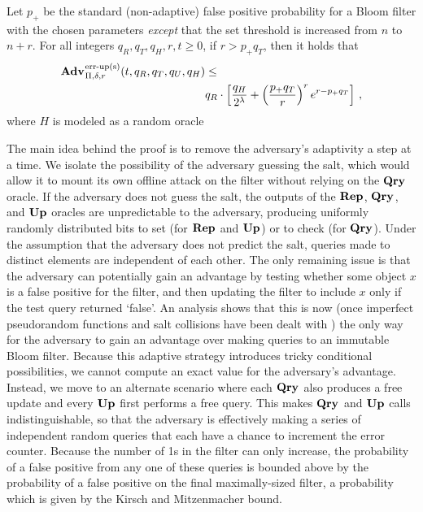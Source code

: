 \begin{theorem}\label{thm:sbf-erreps}
Let $p_+$ be the standard (non-adaptive) false positive probability for a Bloom
filter with the chosen parameters \emph{except} that the set threshold is
increased from $n$ to $n+r$. For all integers $q_R, q_T, q_H, r, t \geq 0$, if
$r > p_+q_T$, then it holds that
  \begin{eqnarray*}
    \begin{aligned}
      \Adv{\erreps}_{\Pi,\delta,r}(t,q_R, q_T, q_U, q_H) &\leq \\
          & q_R \cdot \left[
      \frac{q_H}{2^\lambda} +
      \left(\frac{p_+q_T}{r}\right)^re^{r-p_+q_T}\right]\,,
    \end{aligned}
\end{eqnarray*}
where $H$ is modeled as a random oracle
\end{theorem}

%
The main idea behind the proof is to remove the adversary's
adaptivity a step at a time. We isolate the possibility of the adversary
guessing the salt, which would allow it to mount its own offline attack on the
filter without relying on the $\textup{\textbf{Qry}}\hspace{0.5pt}$ oracle. If the adversary does not guess
the salt, the outputs of the $\textup{\textbf{Rep}}\hspace{0.5pt}$, $\textup{\textbf{Qry}}\hspace{0.5pt}$, and $\textup{\textbf{Up}}\hspace{0.5pt}$ oracles are
unpredictable to the adversary, producing uniformly randomly distributed bits to
set (for $\textup{\textbf{Rep}}\hspace{0.5pt}$ and $\textup{\textbf{Up}}\hspace{0.5pt}$) or to check (for $\textup{\textbf{Qry}}\hspace{0.5pt}$). Under the assumption
that the adversary does not predict the salt, queries made to distinct elements
are independent of each other. The only remaining issue is that the adversary
can potentially gain an advantage by testing whether some object $x$ is a false
positive for the filter, and then updating the filter to include $x$ only if the
test query returned `false'.
%
An analysis shows that this is now (once imperfect
pseudorandom functions and salt collisions have been dealt with )
%
the only way for the adversary to gain an advantage over making queries to an
immutable Bloom filter. Because this adaptive strategy introduces tricky
conditional possibilities, we cannot compute an exact value for the adversary's
advantage.  Instead, we move to an alternate scenario where each $\textup{\textbf{Qry}}\hspace{0.5pt}$ also
produces a free update and every $\textup{\textbf{Up}}\hspace{0.5pt}$ first performs a free query. This makes
$\textup{\textbf{Qry}}\hspace{0.5pt}$ and $\textup{\textbf{Up}}\hspace{0.5pt}$ calls indistinguishable, so that the adversary is effectively
making a series of independent random queries that each have a chance to
increment the error counter. Because the number of 1s in the filter can only
increase, the probability of a false positive from any one of these queries is
bounded above by the probability of a false positive on the final
maximally-sized filter, a probability which is given by the Kirsch and
Mitzenmacher bound.


